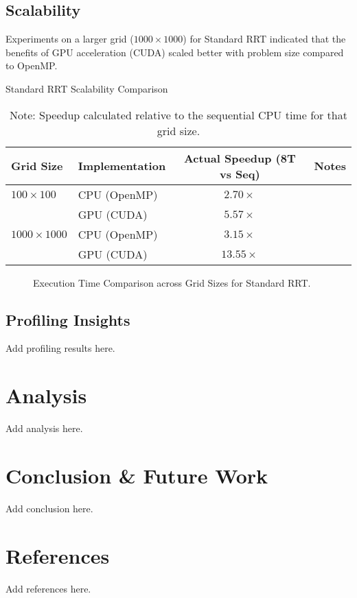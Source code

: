 \documentclass{article}
\begin{document}
\subsection{Scalability}
Experiments on a larger grid ($1000 \times 1000$) for Standard RRT indicated that the benefits of GPU acceleration (CUDA) scaled better with problem size compared to OpenMP.

\begin{table}[h]
    \centering
    \caption{Standard RRT Scalability Comparison}
    \label{tab:scalability}
    \begin{tabular}{llcc}
        \toprule
        Grid Size          & Implementation          & Actual Speedup (8T vs Seq) & Notes \\
        \midrule
        $100 \times 100$   & CPU (OpenMP)            & $2.70 \times$              &  \\
                           & GPU (CUDA)              & $5.57 \times$              &  \\
        \midrule
        $1000 \times 1000$ & CPU (OpenMP)            & $3.15 \times$              &  \\
                           & GPU (CUDA)              & $13.55 \times$             &  \\
        \bottomrule
    \end{tabular}
    \caption*{Note: Speedup calculated relative to the sequential CPU time for that grid size.}
\end{table}

\begin{figure}[h]
    \centering
    \caption{Execution Time Comparison across Grid Sizes for Standard RRT.}
    \label{fig:scaling_comp}
\end{figure}


\subsection{Profiling Insights}

Add profiling results here.
\section{Analysis}

Add analysis here.
\section{Conclusion \& Future Work}

Add conclusion here.


\section*{References}
Add references here.
\end{document}
